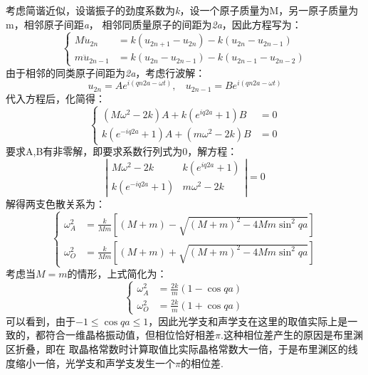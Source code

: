 \documentclass[UTF8]{ctexart}
\begin{document}
考虑简谐近似，设谐振子的劲度系数为\emph{k}，设一个原子质量为M，另一原子质量为m，相邻原子间距\emph{a}，
相邻同质量原子的间距为\emph{2a}，因此方程写为：
\begin{equation*}
    \left\{\begin{aligned}
        M\ddot{u}_{2n}&=k(u_{2n+1}-u_{2n})-k(u_{2n}-u_{2n-1})\\
        m\ddot{u}_{2n-1}&=k(u_{2n}-u_{2n-1})-k(u_{2n-1}-u_{2n-2}) 
    \end{aligned}\right.
\end{equation*}
由于相邻的同类原子间距为\emph{2a}，考虑行波解：
$$u_{2n}=Ae^{i(qn2a-\omega t)},\ \ \ \ u_{2n-1}=Be^{i(qn2a-\omega t)}$$
代入方程后，化简得：
\begin{equation*}
    \left\{\begin{aligned}
        (M\omega^2-2k)A+k(e^{iq2a}+1)B&=0\\
        k(e^{-iq2a}+1)A+(m\omega^2-2k)B&=0
    \end{aligned}\right.
\end{equation*}
要求A,B有非零解，即要求系数行列式为0，解方程：
\begin{equation*}
    \left|\begin{array}{ccc}
        M\omega^2-2k & k(e^{iq2a}+1)\\
        k(e^{-iq2a}+1) & m\omega^2-2k
    \end{array}\right|=0
\end{equation*}
解得两支色散关系为：
\begin{equation*}
    \left\{\begin{aligned}
        \omega_A^2&=\frac{k}{Mm}\left[(M+m)-\sqrt{(M+m)^2-4Mm\sin^2{qa}}\right]\\
        \omega_O^2&=\frac{k}{Mm}\left[(M+m)+\sqrt{(M+m)^2-4Mm\sin^2{qa}}\right]
    \end{aligned}\right.
\end{equation*}
考虑当$M=m$的情形，上式简化为：
\begin{equation*}
    \left\{\begin{aligned}
        \omega_A^2&=\frac{2k}{m}\left(1-\cos{qa}\right)\\
        \omega_O^2&=\frac{2k}{m}\left(1+\cos{qa}\right)
    \end{aligned}\right.
\end{equation*}
可以看到，由于$-1\leq\cos{qa}\leq 1$，因此光学支和声学支在这里的取值实际上是一致的，都符合一维晶格振动值，但相位恰好相差$\pi$.这种相位差产生的原因是布里渊区折叠，即在
取晶格常数时计算取值比实际晶格常数大一倍，于是布里渊区的线度缩小一倍，光学支和声学支发生一个$\pi$的相位差.
\vskip 0.5cm
\end{document}
